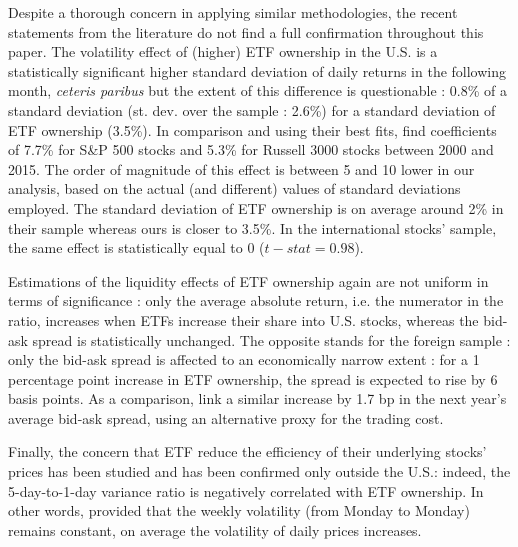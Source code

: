 Despite a thorough concern in applying similar methodologies, the recent statements from the literature do not find a full confirmation throughout this paper. The volatility effect of (higher) ETF ownership in the U.S. is a statistically significant higher standard deviation of daily returns in the following month, \textit{ceteris paribus} but the extent of this difference is questionable : 0.8\% of a standard deviation (st. dev. over the sample : 2.6\%) for a standard deviation of ETF ownership (3.5\%). In comparison and using their best fits, \textcite{Ben-David2018} find coefficients of 7.7\% for S\&P 500 stocks and 5.3\% for Russell 3000 stocks between 2000 and 2015. The order of magnitude of this effect is between 5 and 10 lower in our analysis, based on the actual (and different) values of standard deviations employed. The standard deviation of ETF ownership is on average around 2\% in their sample whereas ours is closer to 3.5\%. In the international stocks' sample, the same effect is statistically equal to 0 ($\mathit{t-stat} = 0.98$).

Estimations of the liquidity effects of ETF ownership again are not uniform in terms of significance : only the average absolute return, i.e. the numerator in the \textcite{Amihud2002} ratio, increases when ETFs increase their share into U.S. stocks, whereas the bid-ask spread is statistically unchanged. The opposite stands for the foreign sample : only the bid-ask spread is affected to an economically narrow extent : for a 1 percentage point increase in ETF ownership, the spread is expected to rise by 6 basis points. As a comparison, \textcite{Israeli2017} link a similar increase by 1.7 bp in the next year's average bid-ask spread, using an alternative proxy for the trading cost.

Finally, the concern that ETF reduce the efficiency of their underlying stocks' prices has been studied and has been confirmed only outside the U.S.: indeed, the 5-day-to-1-day variance ratio is negatively correlated with ETF ownership. In other words, provided that the weekly volatility (from Monday to Monday) remains constant, on average the volatility of daily prices increases.

